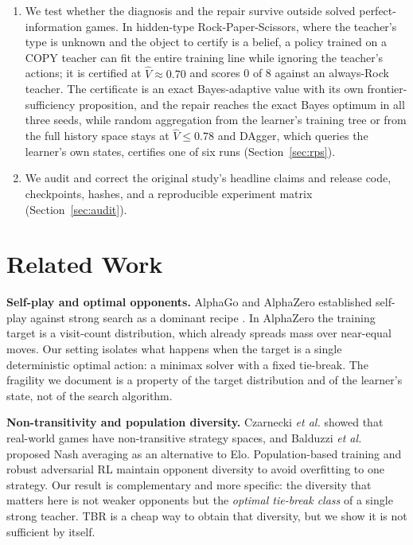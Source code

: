 \documentclass[conference]{IEEEtran}
\newcommand{\etal}{\textit{et al.}}
\begin{document}
\begin{enumerate}
\item We test whether the diagnosis and the repair survive outside solved perfect-information games. In hidden-type Rock-Paper-Scissors, where the teacher's type is unknown and the object to certify is a belief, a policy trained on a COPY teacher can fit the entire training line while ignoring the teacher's actions; it is certified at $\hat V\approx0.70$ and scores 0 of 8 against an always-Rock teacher. The certificate is an exact Bayes-adaptive value with its own frontier-sufficiency proposition, and the repair reaches the exact Bayes optimum in all three seeds, while random aggregation from the learner's training tree or from the full history space stays at $\hat V\le0.78$ and DAgger, which queries the learner's own states, certifies one of six runs (Section~\ref{sec:rps}).
\item We audit and correct the original study's headline claims and release code, checkpoints, hashes, and a reproducible experiment matrix (Section~\ref{sec:audit}).
\end{enumerate}

\section{Related Work}
\label{sec:related}

\textbf{Self-play and optimal opponents.} AlphaGo and AlphaZero established self-play against strong search as a dominant recipe \cite{silver2016,silver2018}. In AlphaZero the training target is a visit-count distribution, which already spreads mass over near-equal moves. Our setting isolates what happens when the target is a single deterministic optimal action: a minimax solver with a fixed tie-break. The fragility we document is a property of the target distribution and of the learner's state, not of the search algorithm.

\textbf{Non-transitivity and population diversity.} Czarnecki \etal \cite{czarnecki2020} showed that real-world games have non-transitive strategy spaces, and Balduzzi \etal \cite{balduzzi2019} proposed Nash averaging as an alternative to Elo. Population-based training \cite{jaderberg2019} and robust adversarial RL \cite{pinto2017} maintain opponent diversity to avoid overfitting to one strategy. Our result is complementary and more specific: the diversity that matters here is not weaker opponents but the \emph{optimal tie-break class} of a single strong teacher. TBR is a cheap way to obtain that diversity, but we show it is not sufficient by itself.
\end{document}
